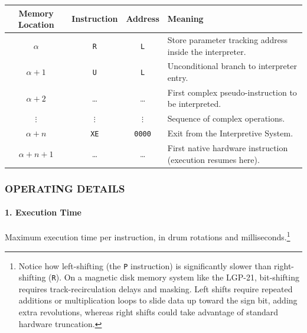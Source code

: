 \medskip
\begin{table}[h!]
\centering
\begin{tabularx}{\textwidth}{cccX}
\toprule
\textbf{Memory Location} & \textbf{Instruction} & \textbf{Address} & \textbf{Meaning} \\
\midrule
$\alpha$          & \texttt{R}      & \texttt{L}       & Store parameter tracking address inside the interpreter. \\
$\alpha + 1$      & \texttt{U}      & \texttt{L}       & Unconditional branch to interpreter entry. \\
$\alpha + 2$      & \dots           & \dots            & First complex pseudo-instruction to be interpreted. \\
$\vdots$          & $\vdots$        & $\vdots$         & Sequence of complex operations. \\
$\alpha + n$      & \texttt{XE}     & \texttt{0000}    & Exit from the Interpretive System. \\
$\alpha + n + 1$  & \dots           & \dots            & First native hardware instruction (execution resumes here). \\
\bottomrule
\end{tabularx}
\end{table}



\subsubsection*{OPERATING DETAILS}

\paragraph{1. Execution Time}
Maximum execution time per instruction, in drum rotations and milliseconds.\footnote{Notice how left-shifting (the \texttt{P} instruction) is significantly slower than right-shifting (\texttt{R}). On a magnetic disk memory system like the LGP-21, bit-shifting requires track-recirculation delays and masking. Left shifts require repeated additions or multiplication loops to slide data up toward the sign bit, adding extra revolutions, whereas right shifts could take advantage of standard hardware truncation.}

